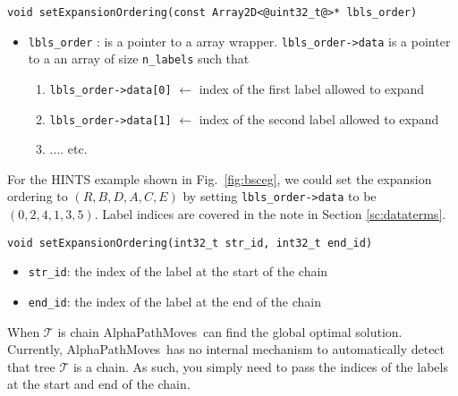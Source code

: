 \documentclass[12pt,letterpaper]{article}
\def\APM{{\ttfamily AlphaPathMoves}~}
\def\Tree{\mathcal{T}}
\def\Tree{\mathcal{T}}
\begin{document}
\begin{lstlisting}
void setExpansionOrdering(const Array2D<@uint32_t@>* lbls_order)
\end{lstlisting}
\begin{itemize}
\item \lstinline{lbls_order} : is a pointer to a array wrapper. \lstinline{lbls_order->data} is a pointer to a an array of size \lstinline[mathescape=true]{n_labels} such that
    \begin{enumerate}
\item[] \lstinline{lbls_order->data[0]} $\gets$ index of the first label allowed to expand
\item[] \lstinline{lbls_order->data[1]} $\gets$ index of the second label allowed to expand
\item[] .... etc.
\end{enumerate}
\end{itemize}
For the HINTS example shown in Fig.~\ref{fig:bsceg}, we could set the expansion ordering to $(R,B,D,A,C,E)$ by setting  \lstinline{lbls_order->data} to be $(0,2,4,1,3,5)$. Label indices are covered in the note in Section \ref{sc:dataterms}.
\\
\begin{lstlisting}
void setExpansionOrdering(int32_t str_id, int32_t end_id)
\end{lstlisting}
\begin{itemize}
\item \lstinline{str_id}: the index of the label at the start of the chain
\item \lstinline{end_id}: the index of the label at the end of the chain
\end{itemize}
\begin{tcolorbox}
When $\Tree$ is chain \APM can find the global optimal solution. Currently, \APM has no internal mechanism to automatically detect that tree $\Tree$ is a chain. As such, you simply need to pass the indices of the labels at the start and end of the chain.
\end{tcolorbox}
\end{document}
